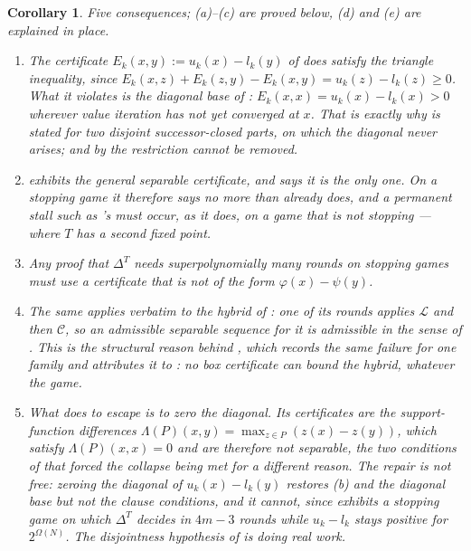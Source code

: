 \documentclass[11pt]{article}
\theoremstyle{plain}
\newtheorem{corollary}[theorem]{Corollary}
\theoremstyle{definition}
\begin{document}
\begin{corollary}\label{cor:separable}
Five consequences; (a)--(c) are proved below, (d) and (e) are explained
in place.
\begin{enumerate}[label=(\alph*),leftmargin=2.2em]
\item The certificate $E_k(x,y):=u_k(x)-l_k(y)$ of
       \emph{does} satisfy the triangle
      inequality, since
      $E_k(x,z)+E_k(z,y)-E_k(x,y)=u_k(z)-l_k(z)\ge0$. What it violates is
      the diagonal base of : $E_k(x,x)=u_k(x)-l_k(x)>0$
      wherever value iteration has not yet converged at $x$. That is
      exactly why  is stated for two
      \emph{disjoint} successor-closed parts, on which the diagonal never
      arises; and by  the restriction cannot be
      removed.
\item {} exhibits the general separable
      certificate, and  says it is the only one. On a
      stopping game it therefore says no more than
       already does, and a permanent stall such
      as 's must occur, as it does, on a game that
      is not stopping --- where $T$ has a second fixed point.
\item Any proof that $\Delta^{T}$ needs superpolynomially many rounds on
      stopping games must use a certificate that is not of the form
      $\varphi(x)-\psi(y)$.
\item The same applies verbatim to the hybrid of : one
      of its rounds applies $\mathcal L$ and then $\mathcal C$, so an
      admissible separable sequence for it is admissible in the sense of
      . This is the structural reason behind
      , which records the same failure for
      one family and attributes it to : no box
      certificate can bound the hybrid, whatever the game.
\item What  does to escape is to zero
      the diagonal. Its certificates are the support-function differences
      $\Lambda(P)(x,y)=\max_{z\in P}(z(x)-z(y))$, which satisfy
      $\Lambda(P)(x,x)=0$ and are therefore not separable, the two
      conditions of  that forced the collapse being
      met for a different reason. The repair is not free: zeroing the
      diagonal of $u_k(x)-l_k(y)$ restores (b) and
      the diagonal base but not the clause conditions, and it cannot,
      since  exhibits a stopping game on which
      $\Delta^{T}$ decides in $4m-3$ rounds while $u_k-l_k$ stays
      positive for $2^{\Omega(N)}$. The disjointness hypothesis of
       is doing real work.
\end{enumerate}
\end{corollary}
\end{document}
